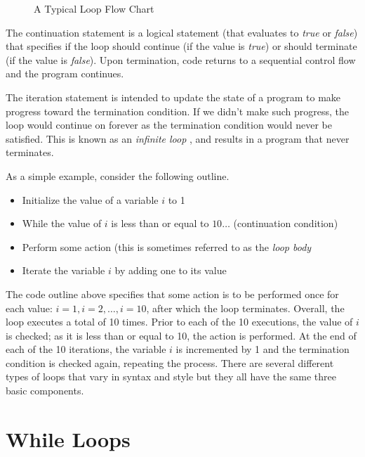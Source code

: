 \begin{figure}
\centering

\caption{A Typical Loop Flow Chart}
\label{figure:loopFlowChart}
\end{figure}

The continuation statement is a logical statement (that evaluates to \emph{true} or \emph{false})
that specifies if the loop should continue (if the value is \emph{true}) or should terminate
(if the value is \emph{false}).  Upon termination, code returns to a sequential control flow and
the program continues.  

The iteration statement is intended to update the state of a program to make progress
toward the termination condition.  If we didn't make such progress, the loop would continue
on forever as the termination condition would never be satisfied.  This is known as an  \emph{infinite loop} , and results in a program that never terminates.

As a simple example, consider the following outline.

\begin{itemize}
  \item Initialize the value of a variable $i$ to 1
  \item While the value of $i$ is less than or equal to $10\ldots$ (continuation condition)
  \item Perform some action (this is sometimes referred to as the \emph{loop body}
  \item Iterate the variable $i$ by adding one to its value
\end{itemize}

The code outline above specifies that some action is to be performed once for
each value: $i=1, i=2, \ldots, i=10$, after which the loop terminates.  Overall, the
loop executes a total of 10 times.  Prior to each of the 10 executions, the value of $i$
is checked; as it is less than or equal to 10, the action is performed.  At the end of
each of the 10 iterations, the variable $i$ is incremented by 1 and the termination
condition is checked again, repeating the process.  There are several different types of loops that vary in syntax and style but they 
all have the same three basic components. 

\section{While Loops}

